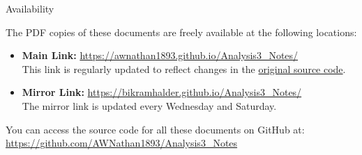 \documentclass[../Analysis-3.tex]{subfiles}
\begin{document}

\newpage
\thispagestyle{plain}

\phantom{.}

\vfill

{\sffamily \LARGE Availability}

\vspace*{0.5cm}

\large

The PDF copies of these documents are freely available at the following locations:

\begin{itemize}
  \item \textbf{Main Link:} \url{https://awnathan1893.github.io/Analysis3_Notes/} \\
        This link is regularly updated to reflect changes in the \href{https://github.com/AWNathan1893/Analysis3_Notes}{original source code}.

  \item \textbf{Mirror Link:} \url{https://bikramhalder.github.io/Analysis3_Notes/} \\
        The mirror link is updated every Wednesday and Saturday.
\end{itemize}

You can access the source code for all these documents on GitHub at: \url{https://github.com/AWNathan1893/Analysis3_Notes}
\end{document}
